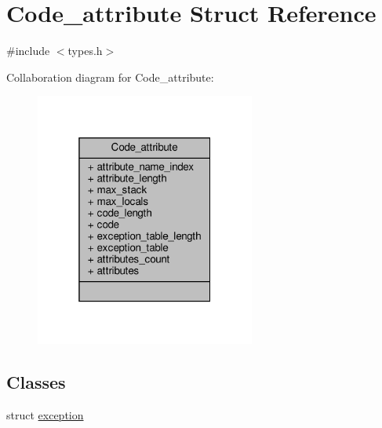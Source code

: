 \hypertarget{structCode__attribute}{}\section{Code\+\_\+attribute Struct Reference}
\label{structCode__attribute}


{\ttfamily \#include $<$types.\+h$>$}



Collaboration diagram for Code\+\_\+attribute\+:\nopagebreak
\begin{figure}[H]
\begin{center}
\leavevmode
\includegraphics[width=205pt]{structCode__attribute__coll__graph}
\end{center}
\end{figure}
\subsection*{Classes}
\begin{DoxyCompactItemize}
\item 
struct \hyperlink{structCode__attribute_1_1exception}{exception}
\end{DoxyCompactItemize}
